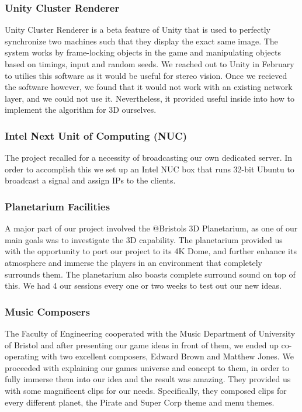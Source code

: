 \documentclass[11pt,a4paper]{article}
\begin{document}
 \subsubsection{ Unity Cluster Renderer}
Unity Cluster Renderer is a beta feature of Unity that is used to perfectly synchronize two machines such that they display the exact same image. The system works by frame-locking objects in the game and manipulating objects based on timings, input and random seeds. We reached out to Unity in February to utilies this software as it would be useful for stereo vision. Once we recieved the software however, we found that it would not work with an existing network layer, and we could not use it. Nevertheless, it provided useful inside into how to implement the algorithm for 3D ourselves.

 \subsubsection{ Intel Next Unit of Computing (NUC)}
 The project recalled for a necessity of broadcasting our own dedicated server. In order to accomplish this we set up an Intel NUC box that runs 32-bit Ubuntu to broadcast a signal and assign IPs to the clients.

 \subsubsection{  Planetarium Facilities}
 A major part of our project involved the @Bristols 3D Planetarium, as one of our main goals was to investigate the 3D capability. The planetarium provided us with the opportunity to port our project to its 4K Dome, and further enhance its atmosphere and immerse the players in an environment that completely surrounds them. The planetarium also boasts complete surround sound on top of this. We had 4 our sessions every one or two weeks to test out our new ideas.

 \subsubsection{ Music Composers}
 The Faculty of Engineering cooperated with the Music Department of University of Bristol and after presenting our game ideas in front of them, we ended up co-operating with two excellent composers, Edward Brown and Matthew Jones. We proceeded with explaining our games universe and concept to them, in order to fully immerse them into our idea and the result was amazing. They provided us with some magnificent clips for our needs. Specifically, they composed clips for every different planet, the Pirate and Super Corp theme and  menu themes.
\end{document}
